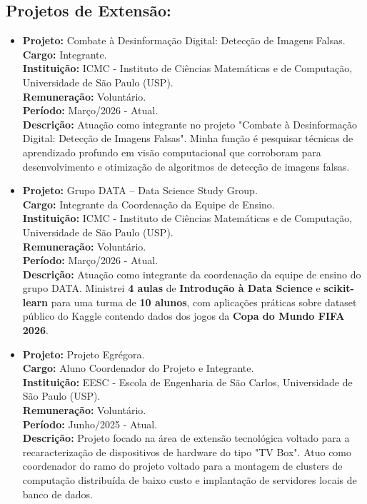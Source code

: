 \documentclass[a4paper,10pt]{article}
\begin{document}
\subsection{Projetos de Extensão:}
\begin{itemize}

\item
\textbf{Projeto:} Combate à Desinformação Digital: Detecção de Imagens Falsas. \\
\textbf{Cargo:} Integrante. \\
\textbf{Instituição:} ICMC - Instituto de Ciências Matemáticas e de Computação, Universidade de São Paulo (USP). \\
\textbf{Remuneração:} Voluntário. \\
\textbf{Período:} Março/2026 - Atual. \\
\textbf{Descrição:} Atuação como integrante no projeto "Combate à Desinformação Digital: Detecção de Imagens Falsas". Minha função é pesquisar técnicas de aprendizado profundo em visão computacional que corroboram para desenvolvimento e otimização de algoritmos de detecção de imagens falsas.

\item
\textbf{Projeto:} Grupo DATA -- Data Science Study Group. \\
\textbf{Cargo:} Integrante da Coordenação da Equipe de Ensino. \\
\textbf{Instituição:} ICMC - Instituto de Ciências Matemáticas e de Computação, Universidade de São Paulo (USP). \\
\textbf{Remuneração:} Voluntário. \\
\textbf{Período:} Março/2026 - Atual. \\
\textbf{Descrição:} Atuação como integrante da coordenação da equipe de ensino do grupo DATA. Ministrei \textbf{4 aulas} de \textbf{Introdução à Data Science} e \textbf{scikit-learn} para uma turma de \textbf{10 alunos}, com aplicações práticas sobre dataset público do Kaggle contendo dados dos jogos da \textbf{Copa do Mundo FIFA 2026}.

\item
\textbf{Projeto:} Projeto Egrégora. \\
\textbf{Cargo:} Aluno Coordenador do Projeto e Integrante. \\
\textbf{Instituição:} EESC - Escola de Engenharia de São Carlos, Universidade de São Paulo (USP). \\
\textbf{Remuneração:} Voluntário. \\
\textbf{Período:} Junho/2025 - Atual. \\
\textbf{Descrição:} Projeto focado na área de extensão tecnológica voltado para a recaracterização de dispositivos de hardware do tipo "TV Box". Atuo como coordenador do ramo do projeto voltado para a montagem de clusters de computação distribuída de baixo custo e implantação de servidores locais de banco de dados.


\end{itemize}
\end{document}
